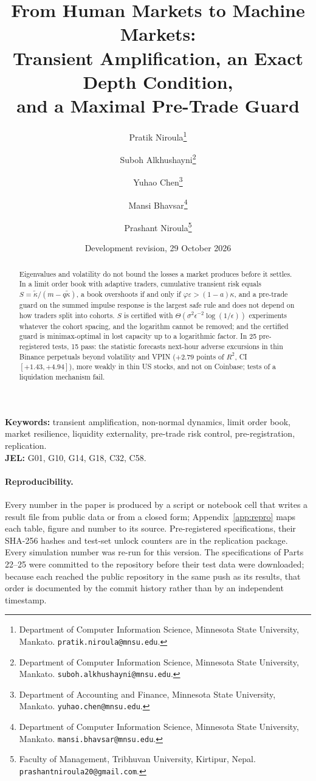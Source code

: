 \documentclass[12pt]{article}
\title{From Human Markets to Machine Markets:\\
Transient Amplification, an Exact Depth Condition,\\ and a Maximal Pre-Trade Guard}
\author{Pratik Niroula\thanks{Department of Computer Information Science, Minnesota State University, Mankato. \texttt{pratik.niroula@mnsu.edu}.}
\and Suboh Alkhushayni\thanks{Department of Computer Information Science, Minnesota State University, Mankato. \texttt{suboh.alkhushayni@mnsu.edu}.}
\and Yuhao Chen\thanks{Department of Accounting and Finance, Minnesota State University, Mankato. \texttt{yuhao.chen@mnsu.edu}.}
\and Mansi Bhavsar\thanks{Department of Computer Information Science, Minnesota State University, Mankato. \texttt{mansi.bhavsar@mnsu.edu}.}
\and Prashant Niroula\thanks{Faculty of Management, Tribhuvan University, Kirtipur, Nepal. \texttt{prashantniroula20@gmail.com}.}}
\date{Development revision, 29 October 2026}
\theoremstyle{definition}
\theoremstyle{remark}
\begin{document}
\maketitle
\thispagestyle{empty}

\begin{abstract}
\noindent Eigenvalues and volatility do not bound the losses a market produces before it settles. In a limit order book with adaptive traders, cumulative transient risk equals $S=\tilde\kappa/(m-q\tilde\kappa)$, a book overshoots if and only if $\varphi\varepsilon>(1-a)\kappa$, and a pre-trade guard on the summed impulse response is the largest safe rule and does not depend on how traders split into cohorts. $S$ is certified with $\Theta(\sigma^2\epsilon^{-2}\log(1/\epsilon))$ experiments whatever the cohort spacing, and the logarithm cannot be removed; and the certified guard is minimax-optimal in lost capacity up to a logarithmic factor. In 25 pre-registered tests, 15 pass: the statistic forecasts next-hour adverse excursions in thin Binance perpetuals beyond volatility and VPIN ($+2.79$ points of $R^2$, CI $[+1.43,+4.94]$), more weakly in thin US stocks, and not on Coinbase; tests of a liquidation mechanism fail.
\end{abstract}

\noindent\textbf{Keywords:} transient amplification, non-normal dynamics, limit order book, market resilience, liquidity externality, pre-trade risk control, pre-registration, replication.\\
\textbf{JEL:} G01, G10, G14, G18, C32, C58.

\paragraph{Reproducibility.} Every number in the paper is produced by a script or notebook cell that writes a result file from public data or from a closed form; Appendix~\ref{app:repro} maps each table, figure and number to its source. Pre-registered specifications, their SHA-256 hashes and test-set unlock counters are in the replication package. Every simulation number was re-run for this version. The specifications of Parts 22--25 were committed to the repository before their test data were downloaded; because each reached the public repository in the same push as its results, that order is documented by the commit history rather than by an independent timestamp.

\newpage
\setcounter{page}{1}
\tableofcontents
\newpage
\end{document}
